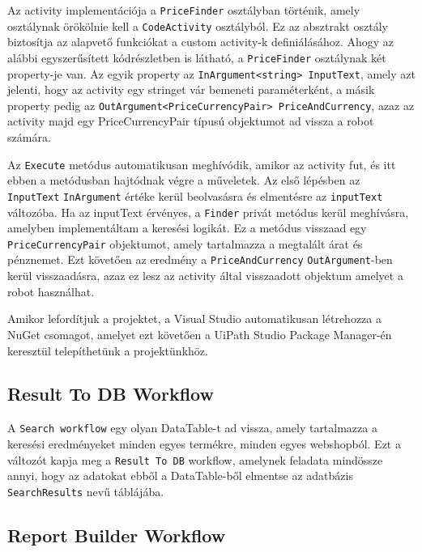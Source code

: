 \documentclass[
]{thesis-ekf}
\theoremstyle{definition}
\theoremstyle{remark}
\begin{document}


Az activity implementációja a \texttt{PriceFinder} osztályban történik, amely osztálynak örökölnie kell a \texttt{CodeActivity} osztályból. Ez az absztrakt osztály biztosítja az alapvető funkciókat a custom activity-k definiálásához. Ahogy az alábbi egyszerűsített kódrészletben is látható, a \texttt{PriceFinder} osztálynak két property-je van. Az egyik property az \texttt{InArgument<string> InputText}, amely azt jelenti, hogy az activity egy stringet vár bemeneti paraméterként, a másik property pedig az \texttt{OutArgument<PriceCurrencyPair> PriceAndCurrency}, azaz az activity majd egy PriceCurrencyPair típusú objektumot ad vissza a robot számára.

Az \texttt{Execute} metódus automatikusan meghívódik, amikor az activity fut, és itt ebben a metódusban hajtódnak végre a műveletek. Az első lépésben az \texttt{InputText} \texttt{InArgument} értéke kerül beolvasásra és elmentésre az \texttt{inputText} változóba. Ha az inputText érvényes, a \texttt{Finder} privát metódus kerül meghívásra, amelyben implementáltam a keresési logikát. Ez a metódus visszaad egy \texttt{PriceCurrencyPair} objektumot, amely tartalmazza a megtalált árat és pénznemet. Ezt követően az eredmény a \texttt{PriceAndCurrency} \texttt{OutArgument}-ben kerül visszaadásra, azaz ez lesz az activity által visszaadott objektum amelyet a robot használhat.



Amikor lefordítjuk a projektet, a Visual Studio automatikusan létrehozza a NuGet csomagot, amelyet ezt követően a UiPath Studio Package Manager-én keresztül telepíthetünk a projektünkhöz.

\subsection{Result To DB Workflow}
A \texttt{Search workflow} egy olyan DataTable-t ad vissza, amely tartalmazza a keresési eredményeket minden egyes termékre, minden egyes webshopból. Ezt a változót kapja meg a \texttt{Result To DB} workflow, amelynek feladata mindössze annyi, hogy az adatokat ebből a DataTable-ből elmentse az adatbázis \texttt{SearchResults} nevű táblájába.

\subsection{Report Builder Workflow}
\end{document}
